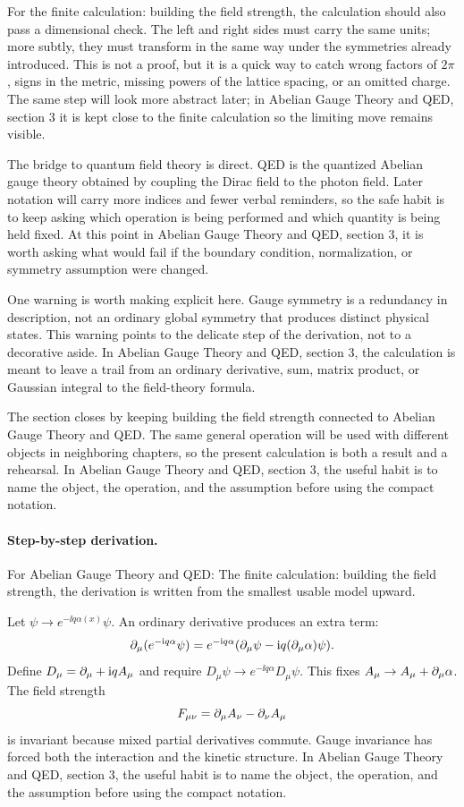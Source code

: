 For the finite calculation: building the field strength, the calculation should also pass a dimensional check.  The left and right sides must carry the same units; more subtly, they must transform in the same way under the symmetries already introduced.  This is not a proof, but it is a quick way to catch wrong factors of \(2\pi\), signs in the metric, missing powers of the lattice spacing, or an omitted charge.  The same step will look more abstract later; in Abelian Gauge Theory and QED, section 3 it is kept close to the finite calculation so the limiting move remains visible.

The bridge to quantum field theory is direct.  QED is the quantized Abelian gauge theory obtained by coupling the Dirac field to the photon field.  Later notation will carry more indices and fewer verbal reminders, so the safe habit is to keep asking which operation is being performed and which quantity is being held fixed.  At this point in Abelian Gauge Theory and QED, section 3, it is worth asking what would fail if the boundary condition, normalization, or symmetry assumption were changed.

One warning is worth making explicit here.  Gauge symmetry is a redundancy in description, not an ordinary global symmetry that produces distinct physical states.  This warning points to the delicate step of the derivation, not to a decorative aside.  In Abelian Gauge Theory and QED, section 3, the calculation is meant to leave a trail from an ordinary derivative, sum, matrix product, or Gaussian integral to the field-theory formula.

The section closes by keeping building the field strength connected to Abelian Gauge Theory and QED.  The same general operation will be used with different objects in neighboring chapters, so the present calculation is both a result and a rehearsal.  In Abelian Gauge Theory and QED, section 3, the useful habit is to name the object, the operation, and the assumption before using the compact notation.



\paragraph{Step-by-step derivation.}

For Abelian Gauge Theory and QED: The finite calculation: building the field strength, the derivation is written from the smallest usable model upward.

Let \(\psi\to e^{-\ii q\alpha(x)}\psi\).  An ordinary derivative produces an extra term:
\[
  \partial_\mu(e^{-\mathrm i q\alpha}\psi)
  =
  e^{-\mathrm i q\alpha}(\partial_\mu\psi-\mathrm i q(\partial_\mu\alpha)\psi).
\]
Define \(D_\mu=\partial_\mu+\mathrm i qA_\mu\) and require \(D_\mu\psi\to e^{-\ii q\alpha}D_\mu\psi\).  This fixes \(A_\mu\to A_\mu+\partial_\mu\alpha\).  The field strength
\[
  F_{\mu\nu}=\partial_\mu A_\nu-\partial_\nu A_\mu
\]
is invariant because mixed partial derivatives commute.  Gauge invariance has forced both the interaction and the kinetic structure.  In Abelian Gauge Theory and QED, section 3, the useful habit is to name the object, the operation, and the assumption before using the compact notation.

